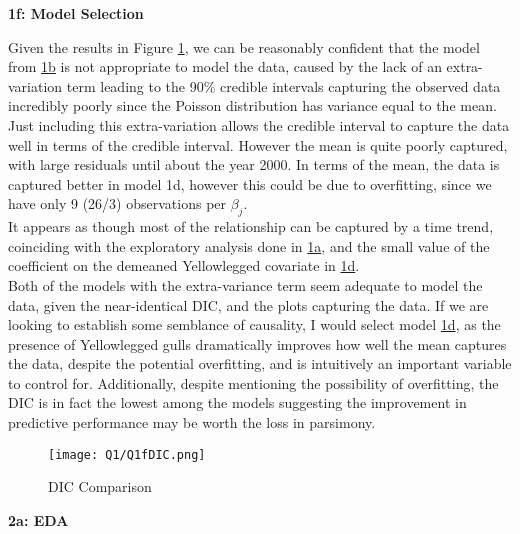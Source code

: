 \documentclass[11pt]{article}
\begin{document}
\textbf{1f: Model Selection} \label{sec::1f}

Given the results in Figure \ref{Fig::1fDIC}, we can be reasonably confident that the model from \hyperref[sec::1b]{1b} is not appropriate to model the data, caused by the lack of an extra-variation term leading to the 90\% credible intervals capturing the observed data incredibly poorly since the Poisson distribution has variance equal to the mean. Just including this extra-variation allows the credible interval to capture the data well in terms of the credible interval. However the mean is quite poorly captured, with large residuals until about the year 2000. In terms of the mean, the data is captured better in model 1d, however this could be due to overfitting, since we have only 9 (26/3) observations per $\beta_j$. \\
It appears as though most of the relationship can be captured by a time trend, coinciding with the exploratory analysis done in \hyperref[sec::1a]{1a}, and the small value of the coefficient on the demeaned Yellowlegged covariate in \hyperref[sec::1d]{1d}. \\
Both of the models with the extra-variance term seem adequate to model the data, given the near-identical DIC, and the plots capturing the data. If we are looking to establish some semblance of causality, I would select model \hyperref[sec::1d]{1d}, as the presence of Yellowlegged gulls dramatically improves how well the mean captures the data, despite the potential overfitting, and is intuitively an important variable to control for. Additionally, despite mentioning the possibility of overfitting, the DIC is in fact the lowest among the models suggesting the improvement in predictive performance may be worth the loss in parsimony.  


\begin{figure}[!h]
\centering
\texttt{[image: Q1/Q1fDIC.png]}
\caption{DIC Comparison} \label{Fig::1fDIC}
\end{figure}

\vspace{-5mm}



\textbf{2a: EDA}
\end{document}
